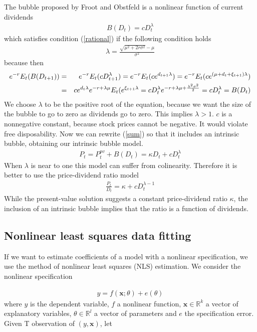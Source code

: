 \documentclass{article}
\begin{document}
The bubble proposed by Froot and Obstfeld is a nonlinear function of current dividends
\begin{eqnarray}
B(D_t) = cD_t^\lambda \label{intrinsic}
\end{eqnarray}
which satisfies condition (\ref{rational}) if the following condition holds
\begin{eqnarray}
\lambda = \frac{\sqrt{\mu^2 + 2r\sigma^2} - \mu}{\sigma^2} \label{eqlambda}
\end{eqnarray}
because then
\begin{eqnarray}
e^{-r}E_t(B(D_{t+1})) &=& e^{-r}E_t(cD_{t+1}^{\lambda}) = e^{-r}E_t(ce^{d_{t+1}\lambda}) = e^{-r}E_t(ce^{(\mu + d_t + \xi_{t + 1})\lambda}) \notag \\ 
 &=&  ce^{d_t\lambda}e^{-r + \lambda \mu }E_t(e^{\xi_{t+1}\lambda} = cD_t^{\lambda}e^{-r + \lambda \mu + \frac{\lambda^2 \sigma^2}{2}} = cD_t^{\lambda} = B(D_t) \notag
\end{eqnarray}
 We choose $\lambda$ to be the positive root of the equation, because we want the size of the bubble to go to zero as dividends go to zero. This implies $\lambda > 1$. $c$ is a nonnegative constant, because stock prices cannot be negative. It would violate free disposability.
Now we can rewrite (\ref{sum}) so that it includes an intrinsic bubble, obtaining our intrinsic bubble model.
\begin{eqnarray}
P_t = P_t^{pv} + B(D_t) = \kappa D_t + c D_t^{\lambda} \label{sumintrinsic}
\end{eqnarray}
When $\lambda$ is near to one this model can suffer from colinearity. Therefore it is better to use the price-dividend ratio model 
\begin{eqnarray}
\frac{P_t}{D_t} =  \kappa  + c D_t^{\lambda - 1} \label{sumratio}
\end{eqnarray}
While the present-value solution suggests a constant price-dividend ratio $\kappa$, the inclusion of an intrinsic bubble implies that the ratio is a function of dividends. 




\subsection{Nonlinear least squares data fitting}
If we want to estimate coefficients of a model with a nonlinear specification, we use the method of nonlinear least squares (NLS) estimation. We consider the nonlinear specification 

\begin{eqnarray}
y = f(\mathbf{x};\theta) + e(\theta) 
\end{eqnarray}
where $y$ is the dependent variable, $f$ a nonlinear function,  $\mathbf{x}\in \mathbb{R}^k$ a vector of explanatory variables, $\theta \in \mathbb{R}^l$ a vector of parameters and $e$ the specification error. Given T observation of $(y,\mathbf{x})$, let
\end{document}
